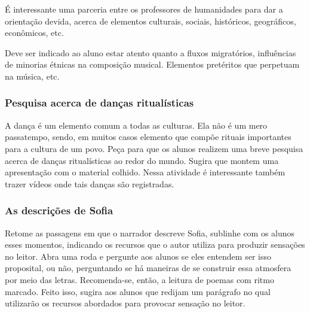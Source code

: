 \documentclass[12pt]{extarticle}
\begin{document}
É interessante uma parceria entre os professores de humanidades
para dar a orientação devida, acerca de elementos culturais, sociais,
históricos, geográficos, econômicos, etc.

Deve ser indicado ao aluno estar atento quanto a fluxos
migratórios, influências de minorias étnicas na composição musical.
Elementos pretéritos que perpetuam na música, etc.

\subsubsection{Pesquisa acerca de danças ritualísticas}


A dança é um elemento comum a todas as culturas. Ela não é um mero passatempo, sendo, em muitos casos elemento que
compõe rituais importantes para a cultura de um povo. Peça para que os
alunos realizem uma breve pesquisa acerca de danças ritualísticas ao
redor do mundo. Sugira que montem uma apresentação com o material
colhido. Nessa atividade é interessante também trazer vídeos onde tais danças são registradas.

\subsubsection{As descrições de Sofia}

  Retome as passagens em que o narrador descreve Sofia, sublinhe com os
  alunos esses momentos, indicando os recursos que o autor utiliza para
  produzir sensações no leitor. Abra uma roda e pergunte aos alunos se
  eles entendem ser isso proposital, ou não, perguntando se há maneiras
  de se construir essa atmosfera por meio das letras. Recomenda-se,
  então, a leitura de poemas com ritmo marcado. Feito isso, sugira aos
  alunos que redijam um parágrafo no qual utilizarão os recursos
  abordados para provocar sensação no leitor.

\end{document}

